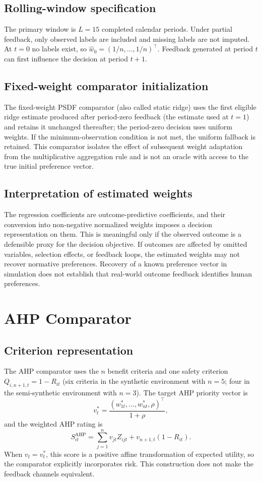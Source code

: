 \documentclass[12pt,a4paper]{article}
\begin{document}
\subsection{Rolling-window specification}
The primary window is $L=15$ completed calendar periods. Under partial feedback, only observed labels are included and missing labels are not imputed. At $t=0$ no labels exist, so $\hat w_0=(1/n,\dots,1/n)^\top$. Feedback generated at period $t$ can first influence the decision at period $t+1$.

\subsection{Fixed-weight comparator initialization}
The fixed-weight PSDF comparator (also called static ridge) uses the first eligible ridge estimate produced after period-zero feedback (the estimate used at $t=1$) and retains it unchanged thereafter; the period-zero decision uses uniform weights. If the minimum-observation condition is not met, the uniform fallback is retained. This comparator isolates the effect of subsequent weight adaptation from the multiplicative aggregation rule and is not an oracle with access to the true initial preference vector.

\subsection{Interpretation of estimated weights}
The regression coefficients are outcome-predictive coefficients, and their conversion into non-negative normalized weights imposes a decision representation on them. This is meaningful only if the observed outcome is a defensible proxy for the decision objective. If outcomes are affected by omitted variables, selection effects, or feedback loops, the estimated weights may not recover normative preferences. Recovery of a known preference vector in simulation does not establish that real-world outcome feedback identifies human preferences.

\section{AHP Comparator}\label{sec:ahp}
\subsection{Criterion representation}
The AHP comparator uses the $n$ benefit criteria and one safety criterion $Q_{i,n+1,t}=1-R_{it}$ (six criteria in the synthetic environment with $n=5$; four in the semi-synthetic environment with $n=3$). The target AHP priority vector is
\begin{equation}v^*_t=\frac{(w^*_{1t},\dots,w^*_{nt},\rho)^\top}{1+\rho},\end{equation}
and the weighted AHP rating is
\begin{equation}S^{\mathrm{AHP}}_{it}=\sum_{j=1}^n v_{jt}Z_{ijt}+v_{n+1,t}(1-R_{it}).\end{equation}
When $v_t=v^*_t$, this score is a positive affine transformation of expected utility, so the comparator explicitly incorporates risk. This construction does not make the feedback channels equivalent.
\end{document}
